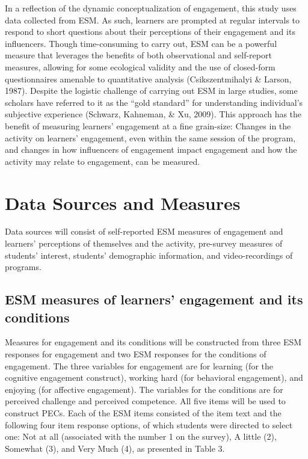 \documentclass[]{msu-thesis}
\theoremstyle{definition}
\theoremstyle{definition}
\theoremstyle{definition}
\theoremstyle{remark}
\begin{document}
In a reflection of the dynamic conceptualization of engagement, this
study uses data collected from ESM. As such, learners are prompted at
regular intervals to respond to short questions about their perceptions
of their engagement and its influencers. Though time-consuming to carry
out, ESM can be a powerful measure that leverages the benefits of both
observational and self-report measures, allowing for some ecological
validity and the use of closed-form questionnaires amenable to
quantitative analysis (Csikszentmihalyi \& Larson, 1987). Despite the
logistic challenge of carrying out ESM in large studies, some scholars
have referred to it as the ``gold standard'' for understanding
individual's subjective experience (Schwarz, Kahneman, \& Xu, 2009).
This approach has the benefit of measuring learners' engagement at a
fine grain-size: Changes in the activity on learners' engagement, even
within the same session of the program, and changes in how influencers
of engagement impact engagement and how the activity may relate to
engagement, can be measured.

\section{Data Sources and Measures}\label{data-sources-and-measures}

Data sources will consist of self-reported ESM measures of engagement
and learners' perceptions of themselves and the activity, pre-survey
measures of students' interest, students' demographic information, and
video-recordings of programs.

\subsection{ESM measures of learners' engagement and its
conditions}\label{esm-measures-of-learners-engagement-and-its-conditions}

Measures for engagement and its conditions will be constructed from
three ESM responses for engagement and two ESM responses for the
conditions of engagement. The three variables for engagement are for
learning (for the cognitive engagement construct), working hard (for
behavioral engagement), and enjoying (for affective engagement). The
variables for the conditions are for perceived challenge and perceived
competence. All five items will be used to construct PECs. Each of the
ESM items consisted of the item text and the following four item
response options, of which students were directed to select one: Not at
all (associated with the number 1 on the survey), A little (2), Somewhat
(3), and Very Much (4), as presented in Table 3.
\end{document}
